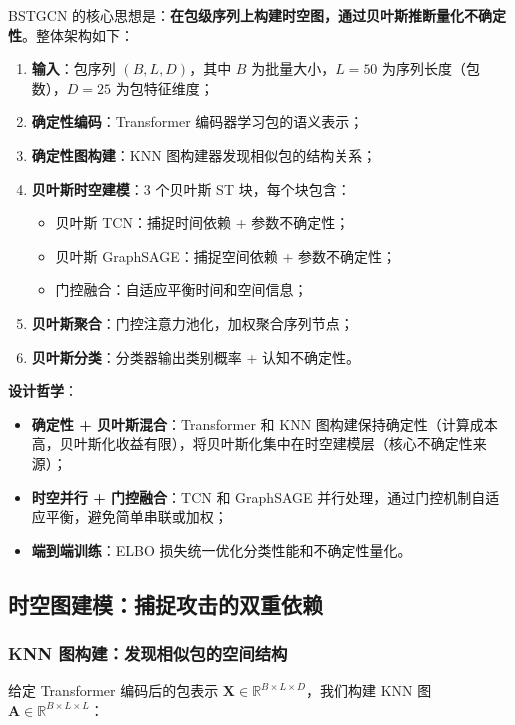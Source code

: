 BSTGCN 的核心思想是：\textbf{在包级序列上构建时空图，通过贝叶斯推断量化不确定性}。整体架构如下：

\begin{enumerate}
  \item \textbf{输入}：包序列 $(B, L, D)$，其中 $B$ 为批量大小，$L=50$ 为序列长度（包数），$D=25$ 为包特征维度；
  \item \textbf{确定性编码}：Transformer 编码器学习包的语义表示；
  \item \textbf{确定性图构建}：KNN 图构建器发现相似包的结构关系；
  \item \textbf{贝叶斯时空建模}：3 个贝叶斯 ST 块，每个块包含：
  \begin{itemize}
    \item 贝叶斯 TCN：捕捉时间依赖 + 参数不确定性；
    \item 贝叶斯 GraphSAGE：捕捉空间依赖 + 参数不确定性；
    \item 门控融合：自适应平衡时间和空间信息；
  \end{itemize}
  \item \textbf{贝叶斯聚合}：门控注意力池化，加权聚合序列节点；
  \item \textbf{贝叶斯分类}：分类器输出类别概率 + 认知不确定性。
\end{enumerate}

\textbf{设计哲学}：
\begin{itemize}
  \item \textbf{确定性 + 贝叶斯混合}：Transformer 和 KNN 图构建保持确定性（计算成本高，贝叶斯化收益有限），将贝叶斯化集中在时空建模层（核心不确定性来源）；
  \item \textbf{时空并行 + 门控融合}：TCN 和 GraphSAGE 并行处理，通过门控机制自适应平衡，避免简单串联或加权；
  \item \textbf{端到端训练}：ELBO 损失统一优化分类性能和不确定性量化。
\end{itemize}

\subsection{时空图建模：捕捉攻击的双重依赖}

\subsubsection{KNN 图构建：发现相似包的空间结构}

给定 Transformer 编码后的包表示 $\mathbf{X} \in \mathbb{R}^{B \times L \times D}$，我们构建 KNN 图 $\mathbf{A} \in \mathbb{R}^{B \times L \times L}$：

